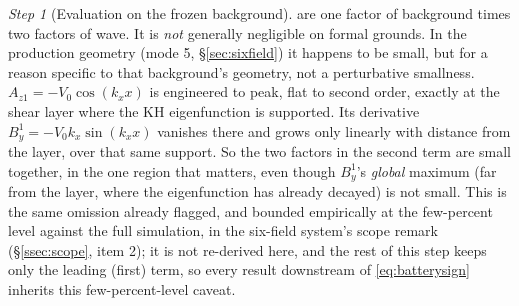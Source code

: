 \documentclass[11pt,a4paper]{article}
\numberwithin{equation}{section}
\theoremstyle{remark}
\newtheorem{step}{Step}[subsection]
\newcommand{\Vo}{V_0}
\newcommand{\Az}{A_{z1}}
\begin{document}
\begin{step}[Evaluation on the frozen background]
are one factor of background times two factors of wave. It is \emph{not}
generally negligible on formal grounds. In the production geometry
(mode 5, \S\ref{sec:sixfield}) it happens to be small, but for a reason
specific to that background's geometry, not a perturbative smallness.
$\Az=-\Vo\cos(k_xx)$ is engineered to peak, flat to second order, exactly
at the shear layer where the KH eigenfunction is supported. Its derivative
$B_y^1=-\Vo k_x\sin(k_xx)$ vanishes there and grows only linearly with
distance from the layer, over that same support. So the two factors in the
second term are small together, in the one region that matters, even
though $B_y^1$'s
\emph{global} maximum (far from the layer, where the eigenfunction has
already decayed) is not small. This is the same omission already flagged,
and bounded empirically at the few-percent level against the full
simulation, in the six-field system's scope remark
(\S\ref{ssec:scope}, item 2); it is not re-derived here, and the rest of
this step keeps only the leading (first) term, so every result downstream
of \eqref{eq:batterysign} inherits this few-percent-level caveat.


\end{step}
\end{document}
